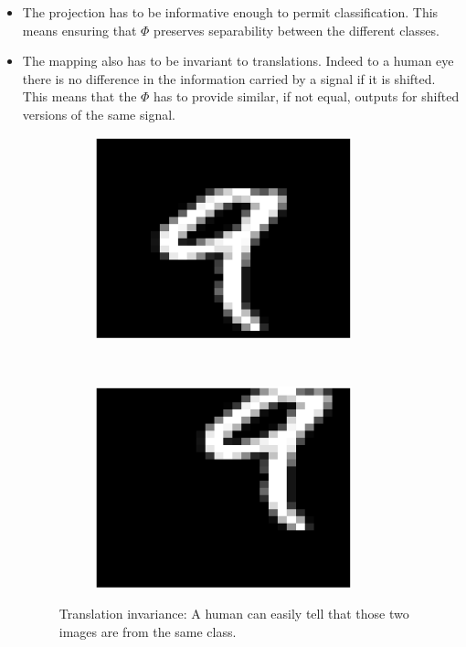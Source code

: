 \documentclass[a4paper,11pt]{report}
\begin{document}
			\begin{itemize}
				\item The projection has to be informative enough to permit classification. This means ensuring that $\Phi$ preserves separability between the different classes.\\

				\item The mapping also has to be invariant to translations. Indeed to a human eye there is no difference in the information carried by a signal if it is shifted. This means that the $\Phi$ has to provide similar, if not equal, outputs for shifted versions of the same signal.\\
		
				\begin{figure}[h]
					\centering
					\begin{subfigure}[t]{0.48\textwidth}
						\centering
						\includegraphics[height=2.3in]{im_nine_ori.eps}
					\end{subfigure}%
					~ 
					\begin{subfigure}[t]{0.48\textwidth}
						\centering
						\includegraphics[height=2.3in]{im_nine_trl.eps}
					\end{subfigure}
					\caption[Translation invariance.]{\centering Translation invariance: A human can easily tell that those two images are from the same class.}
					\label{fig:Illustration translation invariance}
				\end{figure}
	

\end{itemize}
\end{document}
